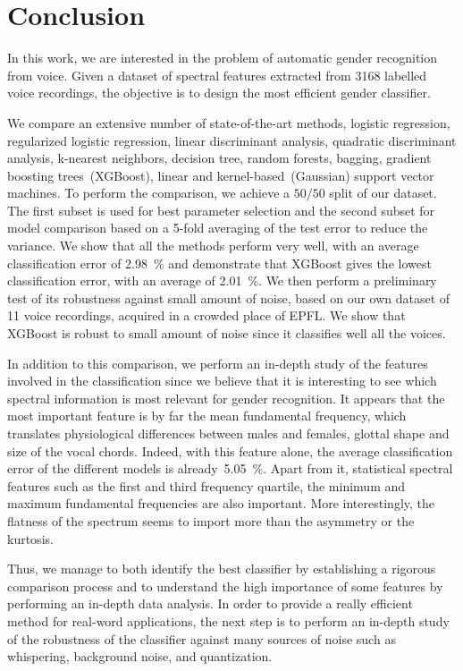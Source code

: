 \chapter{Conclusion}
\label{chap_conclusion}

In this work, we are interested in the problem of automatic gender recognition from voice. Given a dataset of spectral features extracted from \num{3168} labelled voice recordings, the objective is to design the most efficient gender classifier.

We compare an extensive number of state-of-the-art methods, \ie{} logistic regression, regularized logistic regression, linear discriminant analysis, quadratic discriminant analysis, k-nearest neighbors, decision tree, random forests, bagging, gradient boosting trees~(XGBoost), linear and kernel-based~(Gaussian) support vector machines. To perform the comparison, we achieve a $50/50$ split of our dataset. The first subset is used for best parameter selection and the second subset for model comparison based on a \num{5}-fold averaging of the test error to reduce the variance. We show that all the methods perform very well, with an average classification error of \SI{2,98}{\percent} and demonstrate that XGBoost gives the lowest classification error, with an average of \SI{2,01}{\percent}.
We then perform a preliminary test of its robustness against small amount of noise, based on our own dataset of \num{11} voice recordings, acquired in a crowded place of EPFL. We show that XGBoost is robust to small amount of noise since it classifies well all the voices.

In addition to this comparison, we perform an in-depth study of the features involved in the classification since we believe that it is interesting to see which spectral information is most relevant for gender recognition. It appears that the most important feature is by far the mean fundamental frequency, which translates physiological differences between males and females, \eg{} glottal shape and size of the vocal chords. Indeed, with this feature alone, the average classification error of the different models is already~\SI{5,05}{\percent}. Apart from it, statistical spectral features such as the first and third frequency quartile, the minimum and maximum fundamental frequencies are also important. More interestingly, the flatness of the spectrum seems to import more than the asymmetry or the kurtosis. 

Thus, we manage to both identify the best classifier by establishing a rigorous comparison process and to understand the high importance of some features by performing an in-depth data analysis. In order to provide a really efficient method for real-word applications, the next step is to perform an in-depth study of the robustness of the classifier against many sources of noise such as whispering, background noise, and quantization. 
